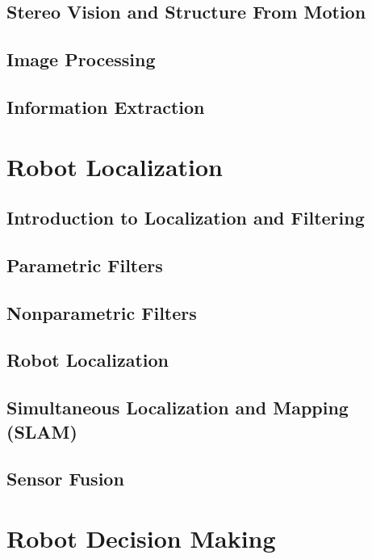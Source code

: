 \documentclass[nohyper,nobib]{tufte-book}
\begin{document}
\chapter{Stereo Vision and Structure From Motion}

\chapter{Image Processing}

\chapter{Information Extraction}

% 

\part{Robot Localization}
\chapter{Introduction to Localization and Filtering}

\chapter{Parametric Filters}

\chapter{Nonparametric Filters}

\chapter{Robot Localization}

\chapter{Simultaneous Localization and Mapping (SLAM)}

\chapter{Sensor Fusion}


\part{Robot Decision Making}
\end{document}
